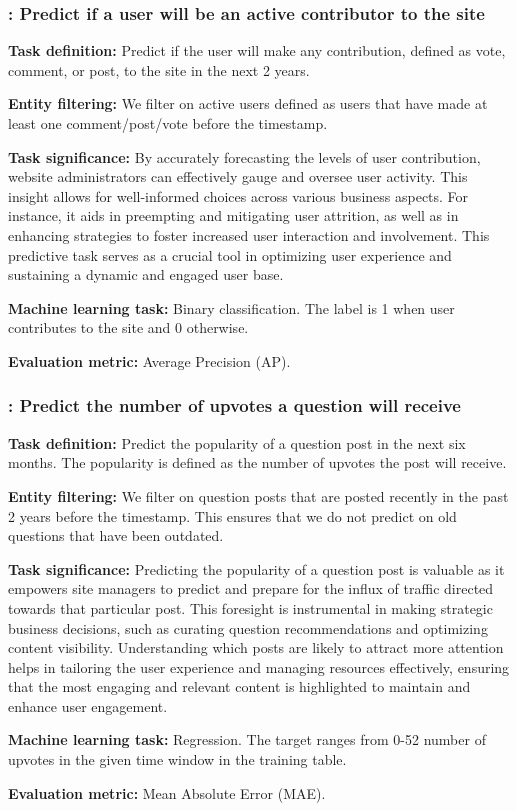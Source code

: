 \subsubsection{\StackExEngage: Predict if a user will be an active contributor to the site} 

\textbf{Task definition:} Predict if the user will make any contribution, defined as vote, comment, or post, to the site in the next 2 years. 

\textbf{Entity filtering:} We filter on active users defined as users that have made at least one comment/post/vote before the timestamp. 

\textbf{Task significance:} By accurately forecasting the levels of user contribution, website administrators can effectively gauge and oversee user activity. This insight allows for well-informed choices across various business aspects. For instance, it aids in preempting and mitigating user attrition, as well as in enhancing strategies to foster increased user interaction and involvement. This predictive task serves as a crucial tool in optimizing user experience and sustaining a dynamic and engaged user base.

\textbf{Machine learning task:} Binary classification. The label is 1 when user contributes to the site and 0 otherwise. 


\textbf{Evaluation metric:} Average Precision (AP).

\subsubsection{\StackExVotes: Predict the number of upvotes a question will receive}

\textbf{Task definition:} Predict the popularity of a question post in the next six months. The popularity is defined as the number of upvotes the post will receive.

\textbf{Entity filtering:} We filter on question posts that are posted recently in the past 2 years before the timestamp. This ensures that we do not predict on old questions that have been outdated.

\textbf{Task significance:} Predicting the popularity of a question post is valuable as it empowers site managers to predict and prepare for the influx of traffic directed towards that particular post. This foresight is instrumental in making strategic business decisions, such as curating question recommendations and optimizing content visibility. Understanding which posts are likely to attract more attention helps in tailoring the user experience and managing resources effectively, ensuring that the most engaging and relevant content is highlighted to maintain and enhance user engagement.

\textbf{Machine learning task:} Regression. The target ranges from 0-52 number of upvotes in the given time window in the training table.


\textbf{Evaluation metric:} Mean Absolute Error (MAE).





